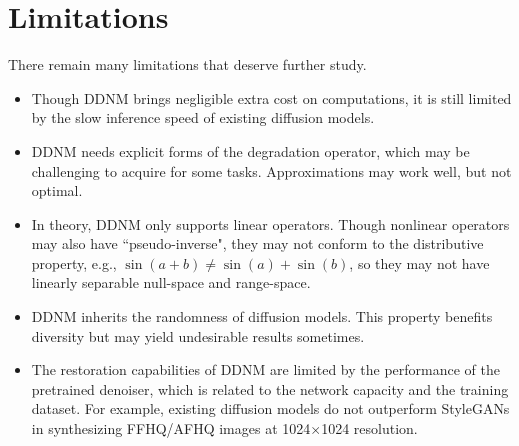 \documentclass{article} \usepackage{iclr2023_conference,times}
\begin{document}
\section{Limitations}
\label{cp: limitations}
There remain many limitations that deserve further study. 
\begin{itemize}
    \item Though DDNM brings negligible extra cost on computations, it is still limited by the slow inference speed of existing diffusion models. 

    \item DDNM needs explicit forms of the degradation operator, which may be challenging to acquire for some tasks. Approximations may work well, but not optimal. 

    \item In theory, DDNM only supports linear operators. Though nonlinear operators may also have ``pseudo-inverse", they may not conform to the distributive property, e.g., $\sin (a+b)\neq\sin (a)+\sin (b)$, so they may not have linearly separable null-space and range-space. 

    \item DDNM inherits the randomness of diffusion models. This property benefits diversity but may yield undesirable results sometimes. 

    \item The restoration capabilities of DDNM are limited by the performance of the pretrained denoiser, which is related to the network capacity and the training dataset. For example, existing diffusion models do not outperform StyleGANs \citep{stylegan,stylegan2,stylegan3} in synthesizing FFHQ/AFHQ images at 1024$\times$1024 resolution.

\end{itemize}
\end{document}
